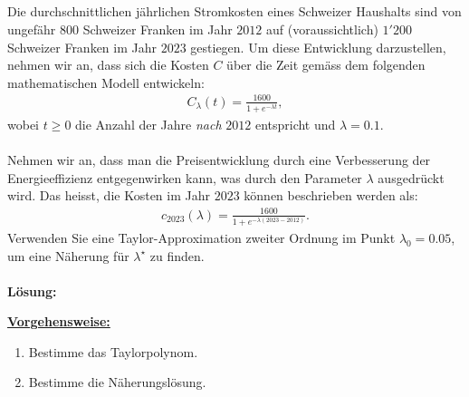 \newpage

\subsection*{}
Die durchschnittlichen jährlichen Stromkosten eines Schweizer Haushalts sind von ungefähr $800$ Schweizer Franken im Jahr $2012$ auf (voraussichtlich) $1'200$ Schweizer Franken im Jahr $2023$ gestiegen. Um diese Entwicklung darzustellen, nehmen wir an, dass sich die Kosten $C$ über die Zeit gemäss dem folgenden mathematischen Modell entwickeln:
\begin{align*}
	C_\lambda(t)
	=
	\frac{1600}{1 + e^{-\lambda t}},
\end{align*}
wobei $t \geq 0$ die Anzahl der Jahre \textit{nach} $2012$ entspricht und $\lambda = 0.1$.
\\
\\
Nehmen wir an, dass man die Preisentwicklung durch eine Verbesserung der Energieeffizienz entgegenwirken kann, was durch den Parameter $\lambda$ ausgedrückt wird. Das heisst, die Kosten im Jahr $2023$ können beschrieben werden als:
\begin{align*}
	c_{2023}(\lambda) 
	=
	\frac{1600}{1 + e^{- \lambda (2023 - 2012)}}.
\end{align*}
Verwenden Sie eine Taylor-Approximation zweiter Ordnung im Punkt $ \lambda_0 = 0.05 $, um eine Näherung für $ \lambda^\star $ zu finden.
\\
 \\
\textbf{Lösung:}
\begin{mdframed}
\underline{\textbf{Vorgehensweise:}}
\renewcommand{\labelenumi}{\theenumi.}
\begin{enumerate}
\item Bestimme das Taylorpolynom.
\item Bestimme die Näherungslösung. 
\end{enumerate}
\end{mdframed}

